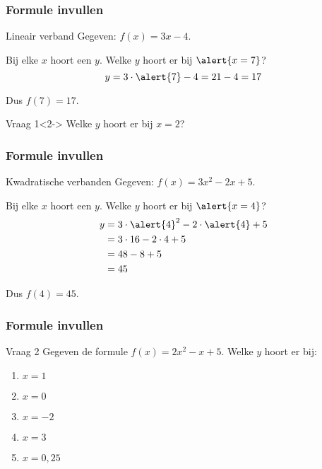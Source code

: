 \begin{frame}
\frametitle{Formule invullen}
\begin{exampleblock}{Lineair verband}
Gegeven: $f(x) = 3x - 4$.

Bij elke $x$ hoort een $y$. Welke $y$ hoort er bij $\alert{x = 7}$?
\[
 y = 3 \cdot \alert{7} - 4 = 21 - 4 = 17
\]

Dus $f(7) = 17 $. 
\end{exampleblock}

\begin{block}{Vraag 1}<2->
Welke $y$ hoort er bij $x = 2$?
\end{block}

\end{frame}

\begin{frame}
\frametitle{Formule invullen}
\begin{exampleblock}{Kwadratische verbanden}
Gegeven: $f(x) = 3x^2 - 2x + 5$.

Bij elke $x$ hoort een $y$. Welke $y$ hoort er bij $\alert{x =4}$?
\begin{align*}
 y &= 3 \cdot \alert{4}^2 - 2 \cdot \alert{4} + 5 \\
 &= 3 \cdot 16 - 2 \cdot 4 + 5 \\
 &= 48 - 8 + 5 \\
 &= 45
 \end{align*}

Dus $f(4) = 45 $. 
\end{exampleblock}
\end{frame}

\begin{frame}
\frametitle{Formule invullen}
\begin{block}{Vraag 2}
Gegeven de formule $f(x) = 2x^2 - x + 5$. Welke $y$ hoort er bij:
\begin{enumerate}
 \item $x = 1$
 \item $x = 0$
 \item $x = -2$
 \item $x = 3$
 \item $x = 0,25$
\end{enumerate}
\end{block}
\end{frame}

